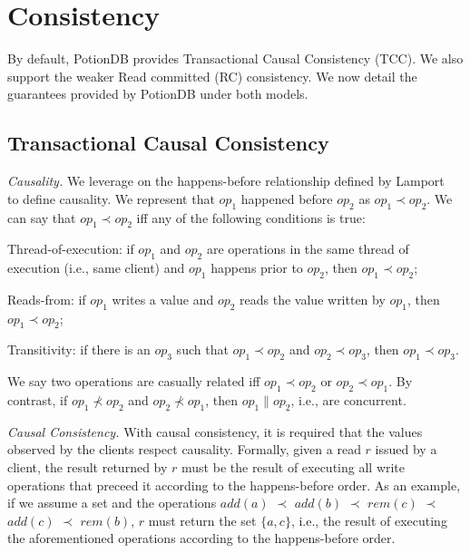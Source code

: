 \documentclass{vldb}
\begin{document}
\section{{Consistency}}
\label{sec:consistency}

By default, PotionDB provides Transactional Causal Consistency (TCC).
We also support the weaker Read committed (RC) consistency. %
We now detail the guarantees provided by PotionDB under both models.

\subsection{Transactional Causal Consistency}
\label{subsec:transactionalcausal}

\emph{Causality.} 
We leverage on the happens-before relationship defined by Lamport~\cite{lamport78} to define causality.
We represent that $op_1$ happened before $op_2$ as $op_1 \prec op_2$.
We can say that $op_1 \prec op_2$ iff any of the following conditions is true:

\begin{compactitem}
	\item Thread-of-execution: if $op_1$ and $op_2$ are operations in the same thread of execution (i.e., same client) and $op_1$ happens prior to $op_2$, then $op_1 \prec op_2$;
	\item Reads-from: if $op_1$ writes a value and $op_2$ reads the value written by $op_1$, then $op_1 \prec op_2$;
	\item Transitivity: if there is an $op_3$ such that $op_1 \prec op_2$ and $op_2 \prec op_3$, then $op_1 \prec op_3$.
\end{compactitem} 

We say two operations are casually related iff $op_1 \prec op_2$ or $op_2 \prec op_1$.
By contrast, if $op_1 \nprec op_2$ and $op_2 \nprec op_1$, then $op_1 \parallel op_2$, i.e., are concurrent.

\emph{Causal Consistency.}
With causal consistency, it is required that the values observed by the clients respect causality.
Formally, given a read $r$ issued by a client, the result returned by $r$ must be the result of executing all write operations that preceed it according to the happens-before order.
As an example, if we assume a set and the operations $add(a)$ $\prec$ $add(b)$ $\prec$ $rem(c)$ $\prec$ $add(c)$ $\prec$ $rem(b)$, $r$ must return the set $\{a, c\}$, i.e., the result of executing the aforementioned operations according to the happens-before order.
\end{document}
